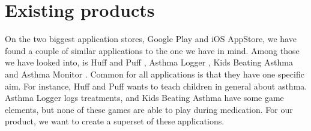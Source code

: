 \section{Existing products}
\label{sec:exisiting-products}

On the two biggest application stores, Google Play and iOS AppStore, we have found a couple of similar applications to the one we have in mind. Among those we have looked into, is Huff and Puff , Asthma Logger
, Kids Beating Asthma  and Asthma Monitor . Common for all applications is that they have one specific aim. For instance, Huff and Puff wants to teach children in general about asthma. Asthma Logger logs treatments, and Kids Beating Asthma have some game elements, but none of these games are able to play during medication. For our product, we want to create a superset of these applications. 


